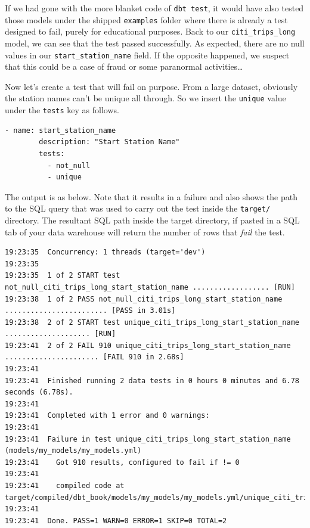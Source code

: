 \documentclass[
]{book}
\begin{document}
If we had gone with the more blanket code of \texttt{dbt\ test}, it would have also tested those models under the shipped \texttt{examples} folder where there is already a test designed to fail, purely for educational purposes. Back to our \texttt{citi\_trips\_long} model, we can see that the test passed successfully. As expected, there are no null values in our \texttt{start\_station\_name} field. If the opposite happened, we suspect that this could be a case of fraud or some paranormal activities\ldots{}

Now let's create a test that will fail on purpose. From a large dataset, obviously the station names can't be unique all through. So we insert the \texttt{unique} value under the \texttt{tests} key as follows.

\begin{verbatim}
- name: start_station_name
        description: "Start Station Name"
        tests:
          - not_null
          - unique
\end{verbatim}

The output is as below. Note that it results in a failure and also shows the path to the SQL query that was used to carry out the test inside the \texttt{target/} directory. The resultant SQL path inside the target directory, if pasted in a SQL tab of your data warehouse will return the number of rows that \emph{fail} the test.

\begin{verbatim}
19:23:35  Concurrency: 1 threads (target='dev')
19:23:35  
19:23:35  1 of 2 START test not_null_citi_trips_long_start_station_name .................. [RUN]
19:23:38  1 of 2 PASS not_null_citi_trips_long_start_station_name ........................ [PASS in 3.01s]
19:23:38  2 of 2 START test unique_citi_trips_long_start_station_name .................... [RUN]
19:23:41  2 of 2 FAIL 910 unique_citi_trips_long_start_station_name ...................... [FAIL 910 in 2.68s]
19:23:41  
19:23:41  Finished running 2 data tests in 0 hours 0 minutes and 6.78 seconds (6.78s).
19:23:41  
19:23:41  Completed with 1 error and 0 warnings:
19:23:41  
19:23:41  Failure in test unique_citi_trips_long_start_station_name (models/my_models/my_models.yml)
19:23:41    Got 910 results, configured to fail if != 0
19:23:41  
19:23:41    compiled code at target/compiled/dbt_book/models/my_models/my_models.yml/unique_citi_trips_long_start_station_name.sql
19:23:41  
19:23:41  Done. PASS=1 WARN=0 ERROR=1 SKIP=0 TOTAL=2
\end{verbatim}
\end{document}
